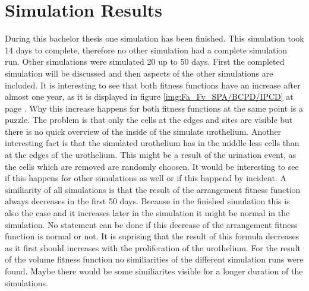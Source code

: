 \section{Simulation Results}\label{sec:SimulationResults}
During this bachelor thesis one simulation has been finished. This simulation took 14 days to complete, therefore no other simulation had a complete simulation run. Other simulations were simulated 20 up to 50 days. First the completed simulation will be discussed and then aspects of the other simulations are included. \newline
It is interesting to see that both fitness functions have an increase after almost one year, as it is displayed in figure \ref{img:Fa_Fv_SPA/BCPD/IPCD} at page \pageref{img:Fa_Fv_SPA/BCPD/IPCD}. Why this increase happens for both fitness functions at the same point is a puzzle. The problem is that only the cells at the edges and sites are visible but there is no quick overview of the inside of the simulate urothelium. Another interesting fact is that the simulated urothelium has in the middle less cells than at the edges of the urothelium. This might be a result of the urination event, as the cells which are removed are randomly choosen. It would be interesting to see if this happens for other simulations as well or if this happend by incident. \newline
A similiarity of all simulations is that the result of the arrangement fitness function always decreases in the first 50 days. Because in the finished simulation this is also the case and it increases later in the simulation it might be normal in the simulation. No statement can be done if this decrease of the arrangement fitness function is normal or not. It is suprising that the result of this formula decreases as it first should increases with the proliferation of the urothelium. For the result of the volume fitness function no similiarities of the different simulation runs were found. Maybe there would be some similiarites visible for a longer duration of the simulations.

